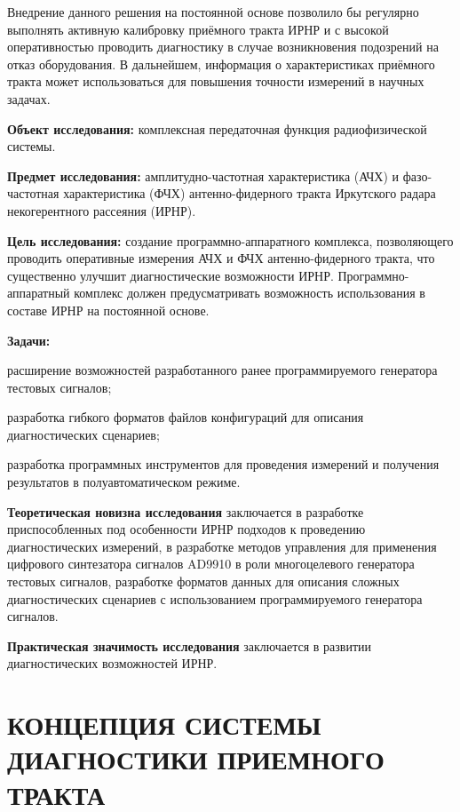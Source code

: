 \documentclass{report}
\begin{document}
Внедрение данного решения на постоянной основе позволило бы регулярно выполнять активную калибровку приёмного тракта ИРНР и с высокой оперативностью проводить диагностику в случае возникновения подозрений на отказ оборудования. В дальнейшем, информация о характеристиках приёмного тракта может использоваться для повышения точности измерений в научных задачах.

{\bf Объект исследования:} комплексная передаточная функция радиофизической системы.

{\bf Предмет исследования:} амплитудно-частотная характеристика (АЧХ) и фазо-частотная характеристика (ФЧХ) антенно-фидерного тракта Иркутского радара некогерентного рассеяния (ИРНР).

{\bf Цель исследования:} создание программно-аппаратного комплекса, позволяющего проводить оперативные измерения АЧХ и ФЧХ антенно-фидерного тракта, что существенно улучшит диагностические возможности ИРНР. Программно-аппаратный комплекс должен предусматривать возможность использования в составе ИРНР на постоянной основе.

{\bf Задачи:}
\begin{enumarabic}
\item расширение возможностей разработанного ранее программируемого генератора тестовых сигналов;
\item разработка гибкого форматов файлов конфигураций для описания диагностических сценариев;
\item разработка программных инструментов для проведения измерений и получения результатов в полуавтоматическом режиме.
\end{enumarabic}


{\bf Теоретическая новизна исследования} заключается в разработке приспособленных под особенности ИРНР подходов к проведению диагностических измерений, в разработке методов управления для применения цифрового синтезатора сигналов AD9910 в роли многоцелевого генератора тестовых сигналов, разработке форматов данных для описания сложных диагностических сценариев с использованием программируемого генератора сигналов.

{\bf Практическая значимость исследования} заключается в развитии диагностических возможностей ИРНР.

% 
\setcounter{section}{0} %
\setcounter{subsection}{0} %
\setcounter{equation}{0} %

\chapter{КОНЦЕПЦИЯ СИСТЕМЫ ДИАГНОСТИКИ ПРИЕМНОГО ТРАКТА}
\end{document}
